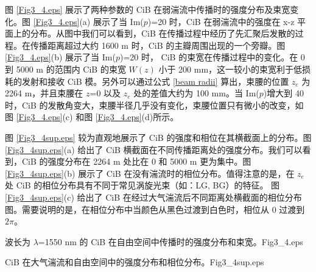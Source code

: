 \documentclass[master]{thesis-uestc}
\begin{document}
图 \ref{Fig3_4.eps} 展示了两种参数的 CiB 在弱湍流中传播时的强度分布及束宽变化。图 \ref{Fig3_4.eps}(a) 展示了当 Im($p$)=20 时，CiB 在弱湍流中的强度在 x-z 平面上的分布。从图中我们可以看到，CiB 在传播过程中经历了先汇聚后发散的过程。在传播距离超过大约 1600 m 时，CiB 的主瓣周围出现的一个旁瓣。图 \ref{Fig3_4.eps}(b) 展示了当 Im($p$)=20 时， CiB 的束宽在传播过程中的变化。在 0 到 5000 m 的范围内 CiB 的束宽 $W(z)$ 小于 200 mm，这一较小的束宽利于低损耗的发射和接收 CiB 模。另外可以通过公式 \eqref{beam radii} 算出，束腰的位置 $z_e$ 为 2264 m，并且束腰在 $z$=0 以及 $z_e$ 处的差值大约为 100 mm。当 Im($p$)增大到 40 时，CiB 的发散角变大，束腰半径几乎没有变化，束腰位置只有微小的改变，如图 \ref{Fig3_4.eps}(c) 和图 \ref{Fig3_4.eps}(d)所示。

图 \ref{Fig3_4sup.eps} 较为直观地展示了 CiB 的强度和相位在其横截面上的分布。图 \ref{Fig3_4sup.eps}(a) 给出了 CiB 横截面在不同传播距离处的强度分布。我们可以看到，CiB 的强度分布在 2264 m 处比在 0 和 5000 m 更为集中。图 \ref{Fig3_4sup.eps}(b) 展示了 CiB 在没有湍流时的相位分布。值得注意的是，在 $z_e$ 处 CiB 的相位分布具有不同于常见涡旋光束（如：LG, BG）的特征\citeup{}。 图 \ref{Fig3_4sup.eps}(c) 给出了 CiB 在经过大气湍流后不同距离处横截面的相位分布图。需要说明的是，在相位分布中当颜色从黑色过渡到白色时，相位从 0 过渡到 $2\pi$。

\begin{pics}[H]{波长为 $\lambda$=1550 nm 的 CiB 在自由空间中传播时的强度分布和束宽。}{Fig3_4.eps}
\end{pics}

\begin{pics}[H]{CiB 在大气湍流和自由空间中的强度分布和相位分布。}{Fig3_4sup.eps}
\end{pics}
\end{document}
